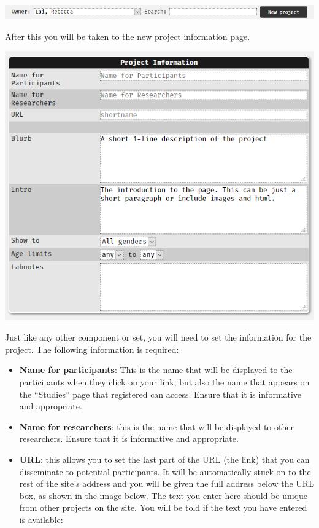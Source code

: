 \documentclass[]{book}
\providecommand{\tightlist}{%
  \setlength{\itemsep}{0pt}\setlength{\parskip}{0pt}}
\begin{document}
\includegraphics{images/screenshots/proj_2.png}

After this you will be taken to the new project information page.

\includegraphics{images/screenshots/proj_3.png}

Just like any other component or set, you will need to set the
information for the project. The following information is required:

\begin{itemize}
\tightlist
\item
  \textbf{Name for participants}: This is the name that will be
  displayed to the participants when they click on your link, but also
  the name that appears on the ``Studies'' page that registered can
  access. Ensure that it is informative and appropriate.
\item
  \textbf{Name for researchers}: this is the name that will be displayed
  to other researchers. Ensure that it is informative and appropriate.
\item
  \textbf{URL}: this allows you to set the last part of the URL (the
  link) that you can disseminate to potential participants. It will be
  automatically stuck on to the rest of the site's address and you will
  be given the full address below the URL box, as shown in the image
  below. The text you enter here should be unique from other projects on
  the site. You will be told if the text you have entered is available:
\end{itemize}
\end{document}
